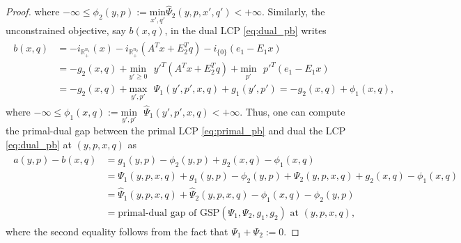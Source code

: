 \documentclass{article} %
\begin{document}
\begin{proof}
where $-\infty \le \phi_2(y, p) := \underset{x',q'}{\text{min}}\text{
}\hat{\Psi}_2(y, p, x', q') < +\infty$.
Similarly, the unconstrained objective, say
$b(x, q)$, in the dual LCP \eqref{eq:dual_pb} writes
\begin{eqnarray*}
  \begin{aligned}
 b(x, q) &= 
 -i_{\mathbb{R}^{n_1}_+}(x) - i_{\mathbb{R}^{n_2}_+}(A^Tx+E_2^Tq) -
 i_{\{0\}}(e_1 - E_1x)\\
    &= -g_2(x, q) + \underset{y' \geq
   0}{\text{min}}\text{ }y'^T(A^Tx + E_2^Tq) +
 \underset{p'}{\text{min}}\text{ }p'^T(e_1-E_1x)\\
    &= -g_2(x, q)
 +\underset{y',p'}{\text{max}}\text{ }\Psi_1(y', p', x, q) +
 g_1(y', p') = -g_2(x, q) + \phi_1(x, q),
   \end{aligned}
\end{eqnarray*}
where $-\infty \le \phi_1(x, q) :=
\underset{y',p'}{\text{min}}\text{ }\hat{\Psi}_1(y', p', x, q) < +\infty$.
Thus, one can compute the primal-dual gap between the primal LCP
\eqref{eq:primal_pb} and dual the LCP \eqref{eq:dual_pb} at $(y, p, x, q)$ as
\begin{eqnarray*}
  \begin{split}
  a(y, p) - b(x, q) &= g_1(y, p) - \phi_2(y, p) + g_2(x, q) - \phi_1(x,
  q) \\
  &= \Psi_1(y, p, x, q) +  g_1(y, p) - \phi_2(y, p) + \Psi_2(y, p, x,
  q) + g_2(x, q) - \phi_1(x, q)\\
  &= \hat{\Psi}_1(y, p, x, q) + \hat{\Psi}_2(y, p, x, q) - \phi_1(x,
  q) - \phi_2(y, p)\\
  &= \text{primal-dual gap of GSP}(\Psi_1, \Psi_2,
  g_1, g_2) \text{ at }(y, p, x, q),
  \end{split}
\end{eqnarray*}
where the second equality follows from the fact that $\Psi_1 + \Psi_2
:= 0$.



\end{proof}
\end{document}
